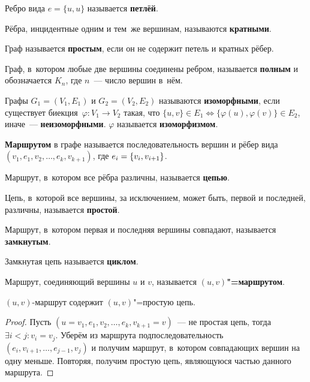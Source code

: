  Ребро вида $e = \{ u, u \}$ называется \textbf{петлёй}.

Рёбра, инцидентные одним и тем~же вершинам, называются \textbf{кратными}.

Граф называется \textbf{простым}, если он не содержит петель и кратных рёбер.

Граф, в~котором любые две вершины соединены ребром, называется \textbf{полным} и обозначается $K_n$, где $n$~--- число вершин в~нём.

Графы $G_1 = (V_1, E_1)$ и $G_2 = (V_2, E_2)$ называются \textbf{изоморфными}, если существует биекция~$\varphi \colon V_1 \to V_2$ такая, что
$\{ u, v \} \in E_1 \Leftrightarrow \{ \varphi(u), \varphi(v) \} \in E_2$, иначе~--- \textbf{неизоморфными}.
$\varphi$ называется \textbf{изоморфизмом}.

 \textbf{Маршрутом} в графе называется последовательность вершин и рёбер вида
$(v_1, e_1, v_2, \ldots, \allowbreak e_k, v_{k+1})$, где $e_i \opbr= \{ v_i, v_{i+1} \}$.

 Маршрут, в~котором все рёбра различны, называется \textbf{цепью}.

Цепь, в~которой все вершины, за исключением, может быть, первой и последней, различны, называется \textbf{простой}.

Маршрут, в~котором первая и последняя вершины совпадают, называется \textbf{замкнутым}.

 Замкнутая цепь называется \textbf{циклом}.

Маршрут, соединяющий вершины $u$ и $v$, называется \textbf{$(u, v)$"=маршрутом}.

\begin{lemma}
\label{lemma:walk_contains_simple_chain}
$(u, v)$-маршрут содержит $(u, v)$"=простую цепь.
\end{lemma}
\begin{proof}
Пусть $(u = v_1, e_1, v_2, \ldots, e_k, v_{k+1} = v)$~--- не простая цепь, тогда $\exists i < j \colon v_i = v_j$.
Уберём из маршрута подпоследовательность $(e_i, v_{i+1}, \ldots, e_{j-1}, v_j)$ и получим маршрут, в~котором совпадающих вершин на одну меньше.
Повторяя, получим простую цепь, являющуюся частью данного маршрута.
\end{proof}

